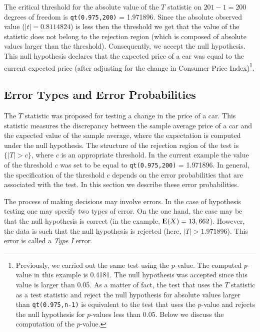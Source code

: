 \documentclass[]{krantz}
\newcommand{\Expec}{{\rm I\kern-.3em E}}
\theoremstyle{definition}
\theoremstyle{definition}
\theoremstyle{definition}
\theoremstyle{remark}
\begin{document}
The critical threshold for the absolute value of the \(T\) statistic on
\(201-1 = 200\) degrees of freedom is \texttt{qt(0.975,200)} = 1.971896. Since
the absolute observed value (\(|t| = 0.8114824\)) is less then the
threshold we get that the value of the statistic does not belong to the
rejection region (which is composed of absolute values larger than the
threshold). Consequently, we accept the null hypothesis. This null
hypothesis declares that the expected price of a car was equal to the
current expected price (after adjusting for the change in Consumer Price
Index)\footnote{Previously, we carried out the same test using the \(p\)-value. The
  computed \(p\)-value in this example is 0.4181. The null hypothesis
  was accepted since this value is larger than 0.05. As a matter of
  fact, the test that uses the \(T\) statistic as a test statistic and
  reject the null hypothesis for absolute values larger than
  \texttt{qt(0.975,n-1)} is equivalent to the test that uses the \(p\)-value
  and rejects the null hypothesis for \(p\)-values less than 0.05. Below
  we discuss the computation of the \(p\)-value.}.

\hypertarget{error-types-and-error-probabilities}{%
\subsection{Error Types and Error Probabilities}\label{error-types-and-error-probabilities}}

The \(T\) statistic was proposed for testing a change in the price of a
car. This statistic measures the discrepancy between the sample average
price of a car and the expected value of the sample average, where the
expectation is computed under the null hypothesis. The structure of the
rejection region of the test is \(\{|T| > c\}\), where \(c\) is an
appropriate threshold. In the current example the value of the threshold
\(c\) was set to be equal to \texttt{qt(0.975,200)} = 1.971896. In general, the
specification of the threshold \(c\) depends on the error probabilities
that are associated with the test. In this section we describe these
error probabilities.

The process of making decisions may involve errors. In the case of
hypothesis testing one may specify two types of error. On the one hand,
the case may be that the null hypothesis is correct (in the example,
\(\Expec(X) = 13,662\)). However, the data is such that the null
hypothesis is rejected (here, \(|T| > 1.971896\)). This error is called a
\emph{Type I} error.
\end{document}
